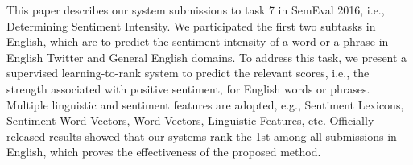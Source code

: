 This paper describes our system submissions to task 7 in SemEval 2016, i.e., Determining Sentiment Intensity. We participated the first two subtasks in English, which are to predict the sentiment intensity of a word or a phrase in English Twitter and General English domains. To address this task, we present a supervised learning-to-rank system to predict the relevant scores, i.e., the strength associated with positive sentiment, for English words or phrases. Multiple linguistic and sentiment features are adopted, e.g., Sentiment Lexicons, Sentiment Word Vectors, Word Vectors, Linguistic Features, etc. Officially released results showed that our systems rank the 1st among all submissions in English, which proves the effectiveness of the proposed method.
